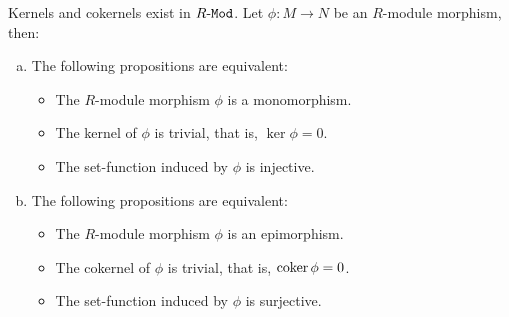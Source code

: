 \begin{proposition}
    \label{prop:ker-coker-in-R-mod-properties}
    Kernels and cokernels exist in \({R\text{-}\texttt{Mod}}\). Let \(\phi: M \to N\) be an
    \(R\)-module morphism, then:
    \begin{enumerate}[(a)]\setlength\itemsep{0em}
        \item The following propositions are equivalent:
              \begin{itemize}\setlength\itemsep{0em}
                  \item The \(R\)-module morphism \(\phi\) is a monomorphism.
                  \item The kernel of \(\phi\) is trivial, that is, \(\ker \phi = 0\).
                  \item The set-function induced by \(\phi\) is injective.
              \end{itemize}
        \item The following propositions are equivalent:
              \begin{itemize}\setlength\itemsep{0em}
                  \item The \(R\)-module morphism \(\phi\) is an epimorphism.
                  \item The cokernel of \(\phi\) is trivial, that is, \(\operatorname{coker} \phi = 0\).
                  \item The set-function induced by \(\phi\) is surjective.
              \end{itemize}
    \end{enumerate}
\end{proposition}

